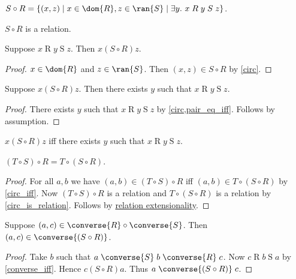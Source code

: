 \begin{definition}\label{circ}
    $S\circ R = \{ (x,z)\mid x\in\dom{R}, z\in\ran{S}\mid \exists y.\  x\mathrel{R}y\mathrel{S}z \}$.
\end{definition}

\begin{proposition}\label{circ_is_relation}
    $S\circ R$ is a relation.
\end{proposition}

\begin{proposition}\label{circ_elem_intro}
    Suppose $x\mathrel{R} y\mathrel{S} z$.
    Then $x\mathrel{(S\circ R)} z$.
\end{proposition}
\begin{proof}
    $x\in\dom{R}$ and $z\in\ran{S}$.
    Then $(x, z)\in S\circ R$ by \cref{circ}.
\end{proof}

\begin{proposition}\label{circ_elem_elim}
    Suppose $x\mathrel{(S\circ R)} z$.
    Then there exists $y$ such that $x\mathrel{R} y\mathrel{S} z$.
\end{proposition}
\begin{proof}
    There exists $y$ such that $x\mathrel{R} y\mathrel{S} z$ by \cref{circ,pair_eq_iff}.
    Follows by assumption.
\end{proof}

\begin{proposition}\label{circ_iff}
    $x\mathrel{(S\circ R)} z$ iff there exists $y$ such that $x\mathrel{R} y\mathrel{S} z$.
\end{proposition}

\begin{proposition}\label{circ_assoc}
    $(T\circ S)\circ R = T\circ (S\circ R)$.
\end{proposition}
\begin{proof}
    For all $a, b$ we have
        $(a,b)\in (T\circ S)\circ R$ iff $(a,b)\in T\circ (S\circ R)$
        by \cref{circ_iff}.
    Now $(T\circ S)\circ R$ is a relation and $T\circ (S\circ R)$ is a relation by
        \cref{circ_is_relation}.
    Follows by \hyperref[relext]{relation extensionality}.
\end{proof}

\begin{proposition}\label{circ_converse_intro_tuple}
    Suppose $(a, c) \in\converse{R}\circ\converse{S}$.
    Then $(a,c)\in \converse{(S\circ R)}$.
\end{proposition}
\begin{proof}
    Take $b$ such that $a\mathrel{\converse{S}} b\mathrel{\converse{R}} c$.
    Now $c\mathrel{R}b\mathrel{S} a$ by \cref{converse_iff}.
    Hence $c\mathrel{(S\circ R)} a$.
    Thus $a\mathrel{\converse{(S\circ R)}} c$.
\end{proof}

